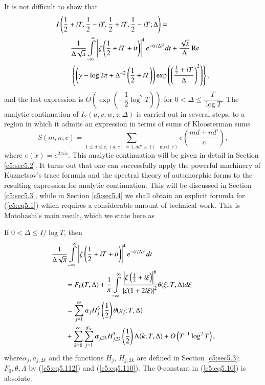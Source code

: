  It is not difficult to show that
 \begin{align}
 & I \left(\frac{1}{2} + i T, \frac{1}{2} - iT, \frac{1}{2} +iT, \frac{1}{2} - i T;\Delta \right) = \label{c5:eq5.8}\\
 & \qquad \frac{1}{\Delta\sqrt{x}} \int\limits^\infty_{-\infty} \left|\zeta \left(\frac{1}{2} + i T+ it \right)\right|^4 e^{-(t/\Delta)^2} dt + \frac{\sqrt{x}}{\Delta} \operatorname{Re}\notag\\
& \qquad  \left\{ \left(\gamma - \log 2 \pi + \Delta^{-2} \left(\frac{1}{2} + i T \right)  \right) \exp \left( \left(\frac{\frac{1}{2}  + iT}{\Delta} \right)^2 \right) \right\},\notag 
 \end{align}
  and the last expression is $O \left(\exp \left(-\dfrac{1}{2} \log^2 T \right) \right)$ for $0 < \Delta \leq \dfrac{T}{\log T}$.  The analytic continuation of $I_2 (u,v,w,z;\Delta)$ is carried out in several steps, to a region in which it admits an expression in terms of sums of Kloosterman sums
 \begin{equation}
 S(m,n;c) = \sum\limits_{1 \leq d \leq c , (d,c) = 1, d d' \equiv 1 (\mod c)} e\left(\frac{md+nd'}{c} \right),\label{c5:eq5.9}
 \end{equation}
 where $e(x) = e^{2\pi ix}$. This analytic continuation will be given
 in detail in Section \ref{c5:sec5.2}. It turns out that one can
 successfully apply the powerful machinery of Kuznetsov's trace
 formula and the spectral theory of automorphic forms to the resulting
 expression for analytic continuation. This will be discussed in
 Section \ref{c5:sec5.3}, while in Section \ref{c5:sec5.4} we shall
 obtain an explicit formula for (\ref{c5:eq5.1}) which requires a
 considerable amount of technical work. This is Motohashi's main
 result, which we state here as 

\setcounter{thm}{0}
 \begin{thm}\label{c5:thm5.1}
 If $0 < \Delta \leq I / \log  T$, then 
 \begin{align}
&  \frac{1}{\Delta \sqrt{\pi}} \int\limits^\infty_{-\infty}
   \left|\zeta \left(\frac{1}{2}+ iT + it\right) \right|^4 e^{-
     (t/\Delta)^2} dt \label{c5:eq5.10} \\ 
 & \qquad = F_0(T,\Delta) + \frac{1}{\pi} \int\limits^\infty_{-\infty}
   \frac{\left|\zeta \left(\frac{1}{2} + i \xi
     \right)\right|^6}{\left|\zeta(1+ 2i\xi)\right|^2} \theta (\xi; T,
   \Delta) d\xi\notag\\ 
&  \qquad = \sum\limits^\infty_{j=1} \alpha_j H^3_j \left(\frac{1}{2}
   \right) \theta (x_j; T,\Delta)\notag\\
&\qquad + \sum\limits^\infty_{k=6} \sum\limits^{d_{2k}}_{j=1} \alpha_{j,2k} 
H^3_{j,2k} \left(\frac{1}{2} \right) \Lambda (k; T, \Delta) + O\left(T^{-1}
\log^2 T\right), \notag
 \end{align}
 where\pageoriginale $\alpha_j,a_{j,2k}$ and the functions $H_j$, $H_{j,2k}$ are defined in Section \ref{c5:sec5.3}; $F_0, \theta, \Lambda$ by (\ref{c5:eq5.112}) and (\ref{c5:eq5.110}). The $0$-constant in (\ref{c5:eq5.10}) is absolute.
 \end{thm}

